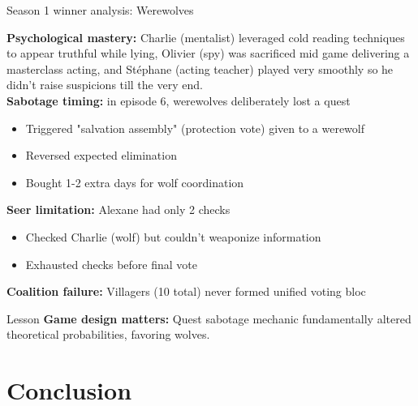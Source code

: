 \documentclass[10pt]{beamer}
\begin{document}
\begin{frame}{Season 1 winner analysis: Werewolves}
 
  \textbf{Psychological mastery:} Charlie (mentalist) leveraged cold reading techniques to appear truthful while lying, Olivier (spy) was sacrificed mid game delivering a masterclass acting, and Stéphane (acting teacher) played very smoothly so he didn't raise suspicions till the very end. \\
    
  \textbf{Sabotage timing:} in episode 6, werewolves deliberately lost a quest
    \begin{itemize}
      \item Triggered "salvation assembly" (protection vote) given to a werewolf
      \item Reversed expected elimination
      \item Bought 1-2 extra days for wolf coordination
    \end{itemize}
    
  \textbf{Seer limitation:} Alexane had only 2 checks
    \begin{itemize}
      \item Checked Charlie (wolf) but couldn't weaponize information
      \item Exhausted checks before final vote
    \end{itemize}
    
  \textbf{Coalition failure:} Villagers (10 total) never formed unified voting bloc \\

  \begin{alertblock}{Lesson}
    \textbf{Game design matters:} Quest sabotage mechanic fundamentally altered theoretical probabilities, favoring wolves.
  \end{alertblock}
\end{frame}

\section{Conclusion}
\end{document}
